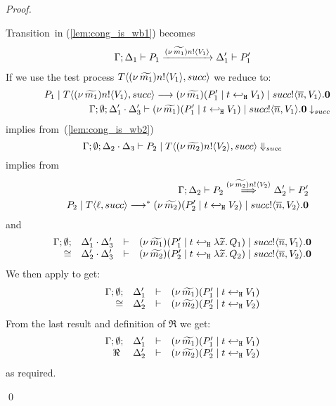 \begin{proof}
\begin{enumerate}
\begin{enumerate}[i.]
						\noi Transition~in (\ref{lem:cong_is_wb1}) becomes
						\begin{eqnarray}
							\Gamma; \Delta_1 \vdash P_1 \xrightarrow{(\nu\, \widetilde{m_1}) n ! \langle V_1 \rangle} \Delta_1' \vdash P_1'
							\label{lem:cong_is_wb3}
						\end{eqnarray}
						\noi If we use the test process $T\langle (\nu\, \widetilde{m_1}) n ! \langle V_1 \rangle, succ \rangle$ we reduce to:%
						\begin{eqnarray*}
							&& P_1 \;|\; T\langle (\nu\, \widetilde{m_1}) n ! \langle V_1 \rangle, succ \rangle
							\longrightarrow
							(\nu\, \widetilde{m_1})(P_1' \;|\; t \hookleftarrow_{\mathtt{H}} V_1) \;|\; succ ! \langle \overline{n}, V_1 \rangle . \mathbf{0} \\
							&& \Gamma; \emptyset; \Delta_1' \cdot \Delta_3' \vdash (\nu\, \widetilde{m_1})(P_1' \;|\; t \hookleftarrow_{\mathtt{H}} V_1) \;|\; succ ! \langle \overline{n}, V_1 \rangle . \mathbf{0} \downarrow_{succ}
						\end{eqnarray*}
						\noi implies from~(\ref{lem:cong_is_wb2})
						\[
							\Gamma; \emptyset; \Delta_2 \cdot \Delta_3 \vdash P_2 \;|\; T\langle (\nu\, \widetilde{m_2}) n ! \langle V_2 \rangle, succ \rangle \Downarrow_{succ}
						\]
						\noi implies from 
						\begin{eqnarray}
							&& \Gamma; \Delta_2 \vdash P_2 \stackrel{(\nu\, \widetilde{m_2}) n ! \langle V_2 \rangle}{\Longrightarrow} \Delta_2' \vdash P_2'
							\label{lem:cong_is_wb4}\\
							&& P_2 \;|\; T \langle \ell, succ \rangle \longrightarrow^{*} (\nu\, \widetilde{m_2})(P_2' \;|\; t \hookleftarrow_{\mathtt{H}} V_2) \;|\; succ ! \langle \overline{n}, V_2 \rangle . \mathbf{0} \nonumber
						\end{eqnarray}
						\noi and
						\[
							\begin{array}{rcll} \Gamma; \emptyset; &\Delta_1' \cdot \Delta_3'& \vdash& (\nu\, \widetilde{m_1})(P_1' \;|\; t \hookleftarrow_{\mathtt{H}} \lambda \widetilde{x}.\,Q_1) \;|\; succ ! \langle \overline{n}, V_1 \rangle . \mathbf{0}\\ \cong &\Delta_2' \cdot \Delta_3'& \vdash &  (\nu\, \widetilde{m_2})(P_2' \;|\; t \hookleftarrow_{\mathtt{H}} \lambda \widetilde{x}.\,Q_2) \;|\; succ ! \langle \overline{n}, V_2 \rangle . \mathbf{0} \end{array}
						\]
						\noi We then apply  to get:
						\[
							\begin{array}{rcll} \Gamma; \emptyset; &\Delta_1'& \vdash& (\nu\, \widetilde{m_1})(P_1' \;|\; t \hookleftarrow_{\mathtt{H}} V_1)\\ \cong &\Delta_2'& \vdash &  (\nu\, \widetilde{m_2})(P_2' \;|\; t \hookleftarrow_{\mathtt{H}} V_2) \end{array}
						\]
						\noi From the last result and definition of $\Re$ we get:
						\[
							\begin{array}{rcll} \Gamma; \emptyset; &\Delta_1'& \vdash& (\nu\, \widetilde{m_1})(P_1' \;|\; t \hookleftarrow_{\mathtt{H}} V_1)\\ \ \Re\  &\Delta_2'& \vdash &  (\nu\, \widetilde{m_2})(P_2' \;|\; t \hookleftarrow_{\mathtt{H}} V_2) \end{array}
						\]
						\noi as required.

%
			\end{enumerate}
\end{enumerate}
	\qed
\end{proof}

